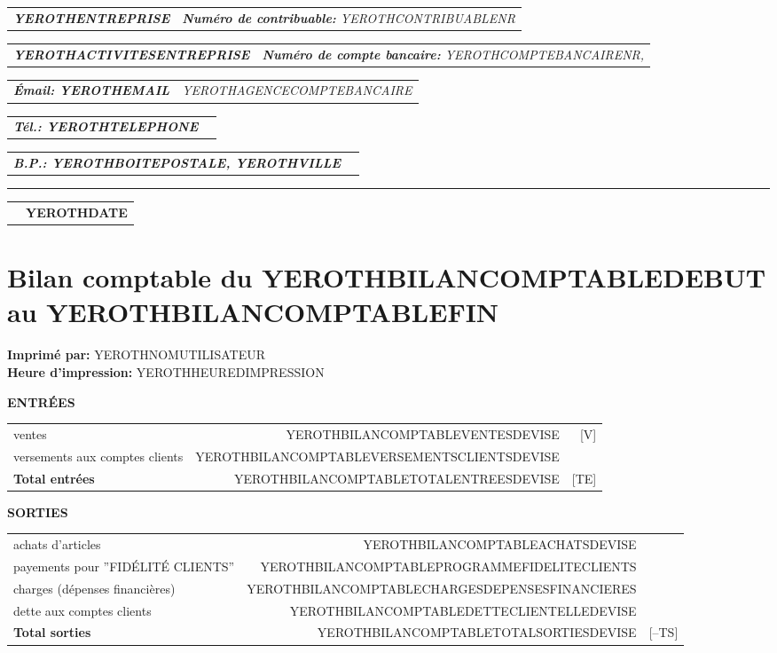 \documentclass[11pt,YEROTHPAPERSPEC,landscape]{article} %
\makeatletter
\newcommand{\headerrow}[2]
{\begin{tabular*}{\linewidth}{l@{\extracolsep{\fill}}r}
	#1 &
	#2 \\
\end{tabular*}}
\newcommand{\emphbold}[1]{\textbf{\emph{#1}}\xspace}
\makeatother
\begin{document}
\bigskip

\headerrow
	{\emphbold{YEROTHENTREPRISE}}
	{\emph{\textbf{Num\'ero de contribuable:} YEROTHCONTRIBUABLENR}}
\headerrow
	{\emphbold{YEROTHACTIVITESENTREPRISE}}
	{\emph{\textbf{Num\'ero de compte bancaire:} YEROTHCOMPTEBANCAIRENR,}}
\headerrow
	{\emphbold{\'Email: YEROTHEMAIL}}
	{\emph{YEROTHAGENCECOMPTEBANCAIRE}}
\headerrow
	{\emphbold{T\'el.: YEROTHTELEPHONE}}
	{}
\headerrow
	{\emphbold{B.P.: YEROTHBOITEPOSTALE, YEROTHVILLE}}
	{}
	
\hrule

\headerrow
	{}
	{\textbf{YEROTHDATE}}

\section*{Bilan comptable du YEROTHBILANCOMPTABLEDEBUT au YEROTHBILANCOMPTABLEFIN}

\textbf{Imprim\'e par:} YEROTHNOMUTILISATEUR\\
\textbf{Heure d'impression:} YEROTHHEUREDIMPRESSION\\

\vspace{0.3cm}

\vspace{1cm}
\textbf{ENTR\'EES}
\begin{table}[!htbp]
\begin{tabular}{lrr}
ventes  						&  YEROTHBILANCOMPTABLEVENTESDEVISE  			& [V] \\ 
versements aux comptes clients  &  YEROTHBILANCOMPTABLEVERSEMENTSCLIENTSDEVISE  & \\ \hline
\textbf{Total entr\'ees}  		&  YEROTHBILANCOMPTABLETOTALENTREESDEVISE & [TE] 		\\ 
\end{tabular}
\end{table}


\vspace{0.5cm}
\textbf{SORTIES}
\begin{table}[!htbp]
\begin{tabular}{lrr}
achats d'articles  						& YEROTHBILANCOMPTABLEACHATSDEVISE  				& \\
payements pour ''FID\'ELIT\'E CLIENTS'' & YEROTHBILANCOMPTABLEPROGRAMMEFIDELITECLIENTS  	& \\  
charges (d\'epenses financi\`eres) 		& YEROTHBILANCOMPTABLECHARGESDEPENSESFINANCIERES  	& \\ 
dette aux comptes clients\footnotemark  &  YEROTHBILANCOMPTABLEDETTECLIENTELLEDEVISE 		&  \\ \hline
\textbf{Total sorties}  		&  YEROTHBILANCOMPTABLETOTALSORTIESDEVISE & [--TS] 			\\ 
\end{tabular}
\end{table}
\end{document}
